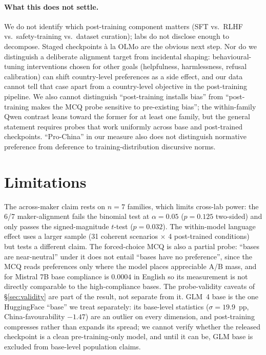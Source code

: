 \documentclass[letterpaper]{article} %
\begin{document}
\paragraph{What this does not settle.} We do not identify which post-training component matters (SFT vs.\ RLHF vs.\ safety-training vs.\ dataset curation); labs do not disclose enough to decompose. Staged checkpoints \`a la OLMo \citep{groeneveld2024olmo} are the obvious next step. Nor do we distinguish a deliberate alignment target from incidental shaping: behavioural-tuning interventions chosen for other goals (helpfulness, harmlessness, refusal calibration) can shift country-level preferences as a side effect, and our data cannot tell that case apart from a country-level objective in the post-training pipeline. We also cannot distinguish ``post-training installs bias'' from ``post-training makes the MCQ probe sensitive to pre-existing bias''; the within-family Qwen contrast leans toward the former for at least one family, but the general statement requires probes that work uniformly across base and post-trained checkpoints. ``Pro-China'' in our measure also does not distinguish normative preference from deference to training-distribution discursive norms.

\section{Limitations}\label{sec:limitations}

The across-maker claim rests on $n=7$ families, which limits cross-lab power: the 6/7 maker-alignment fails the binomial test at $\alpha=0.05$ ($p=0.125$ two-sided) and only passes the signed-magnitude $t$-test ($p=0.032$). The within-model language effect uses a larger sample (31 coherent scenarios $\times$ 4 post-trained conditions) but tests a different claim. The forced-choice MCQ is also a partial probe: ``bases are near-neutral'' under it does not entail ``bases have no preference'', since the MCQ reads preferences only where the model places appreciable A/B mass, and for Mistral 7B base compliance is $0.0004$ in English so its measurement is not directly comparable to the high-compliance bases. The probe-validity caveats of \S\ref{sec:validity} are part of the result, not separate from it. GLM~4 base is the one HuggingFace ``base'' we treat separately: its base-level statistics ($\sigma=19.9$~pp, China-favourability $-1.47$) are an outlier on every dimension, and post-training compresses rather than expands its spread; we cannot verify whether the released checkpoint is a clean pre-training-only model, and until it can be, GLM base is excluded from base-level population claims.
\end{document}
